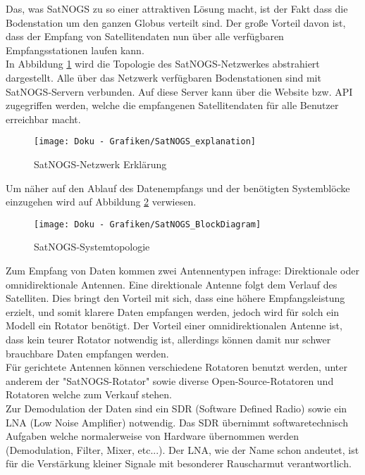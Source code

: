 \documentclass[12pt]{scrreprt}
\begin{document}
	
	Das, was SatNOGS zu so einer attraktiven Lösung macht, ist der Fakt dass die Bodenstation um den ganzen Globus verteilt sind. Der große Vorteil davon ist, dass der Empfang von Satellitendaten nun über alle verfügbaren Empfangsstationen laufen kann.\\
	
	
	In Abbildung \ref{fig:Abb 3.1} wird die Topologie des SatNOGS-Netzwerkes abstrahiert dargestellt.
	Alle über das Netzwerk verfügbaren Bodenstationen sind mit SatNOGS-Servern verbunden. Auf diese Server kann über die Website bzw. API zugegriffen werden, welche die empfangenen Satellitendaten für alle Benutzer erreichbar macht.
	
	
	\begin{figure}[h]
		\begin{center}
			\texttt{[image: Doku - Grafiken/SatNOGS\_explanation]}
			\label{fig:Abb 3.1}
			\caption{SatNOGS-Netzwerk Erklärung}
		\end{center}
	\end{figure}
	
	Um näher auf den Ablauf des Datenempfangs und der benötigten Systemblöcke einzugehen wird auf Abbildung \ref{fig:Abb 3.2} verwiesen.\\	
	
	\begin{figure}[h]
		\begin{center}
			\texttt{[image: Doku - Grafiken/SatNOGS\_BlockDiagram]}
			\label{fig:Abb 3.2}
			\caption{SatNOGS-Systemtopologie}
		\end{center}
	\end{figure}

	Zum Empfang von Daten kommen zwei Antennentypen infrage: Direktionale oder omnidirektionale Antennen. Eine direktionale Antenne folgt dem Verlauf des Satelliten. Dies bringt den Vorteil mit sich, dass eine höhere Empfangsleistung erzielt, und somit klarere Daten empfangen werden, jedoch wird für solch ein Modell ein Rotator benötigt. Der Vorteil einer omnidirektionalen Antenne ist, dass kein teurer Rotator notwendig ist, allerdings können damit nur schwer brauchbare Daten empfangen werden.\\
	
	
	Für gerichtete Antennen können verschiedene Rotatoren benutzt werden, unter anderem der "SatNOGS-Rotator" sowie diverse Open-Source-Rotatoren und Rotatoren welche zum Verkauf stehen.\\
	
	
	Zur Demodulation der Daten sind ein SDR (Software Defined Radio) sowie ein LNA (Low Noise Amplifier) notwendig. Das SDR übernimmt softwaretechnisch Aufgaben welche normalerweise von Hardware übernommen werden (Demodulation, Filter, Mixer, etc...). Der LNA, wie der Name schon andeutet, ist für die Verstärkung kleiner Signale mit besonderer Rauscharmut verantwortlich. \\
	
\end{document}
